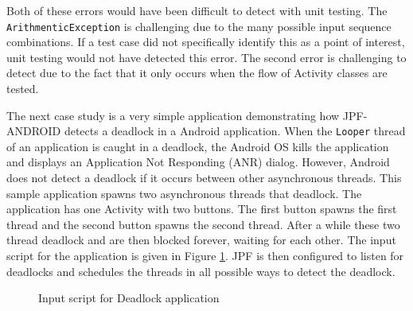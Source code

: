 \documentclass{acm_proc_article-sp}
\begin{document}
Both of these errors would have been difficult to detect with unit testing. The \texttt{ArithmenticException} is challenging due
to the many possible input sequence combinations. If a test case did not specifically identify this as a point of interest, unit testing
would not have detected this error. The second error is challenging to detect due to the fact that it only occurs when the flow of Activity
classes are tested.

The next case study is a very simple application demonstrating how JPF-ANDROID detects a deadlock in a Android application. When the
\texttt{Looper} thread of an application is caught in a deadlock, the Android OS kills the application and displays an
Application Not Responding (ANR) dialog. However, Android does not detect a deadlock if it occurs between other asynchronous threads. This
sample application spawns two asynchronous threads that deadlock. The application has one Activity with two
buttons. The first button spawns the first thread and the second button spawns the second thread. After a while these two thread deadlock
and are then blocked forever, waiting for each other. The input script for the application is given in Figure \ref{fig:deadlock}. JPF is then
configured to listen for deadlocks and schedules the threads in all possible ways to detect the deadlock.

\begin{figure}


\caption{Input script for Deadlock application}
\label{fig:deadlock}
\vspace{-10pt}
\end{figure}
\end{document}
